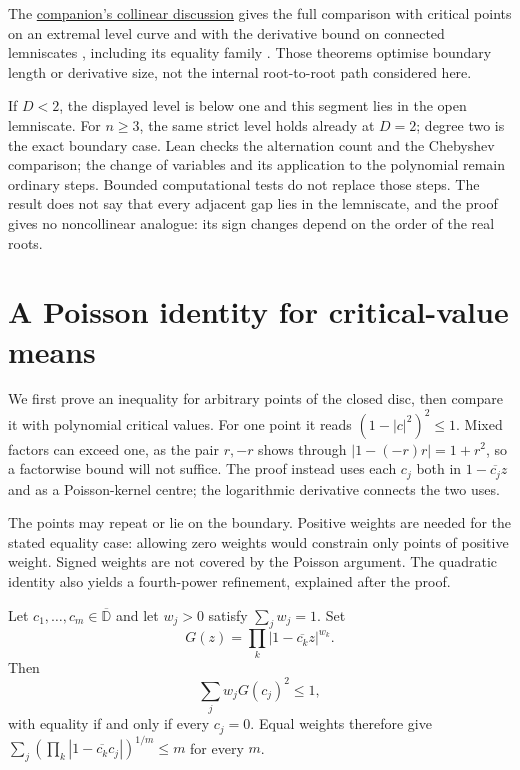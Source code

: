 \documentclass[11pt]{article}
\begin{document}
The \href{erdos1041-lemniscate-reasoning-surface.pdf\#collinear-source-comparison}{companion's collinear discussion} gives the full comparison with critical
points on an extremal level curve \cite[Lemma~5]{eremenko-hayman} and
with the derivative bound on connected lemniscates
\cite[Theorem~1]{eremenko-lempert}, including its equality family
\cite[Theorem~A]{eremenko-markov}. Those theorems optimise boundary length
or derivative size, not the internal root-to-root path considered here.

If $D<2$, the displayed level is below one and this segment lies in the open
lemniscate.  For $n\ge3$, the same strict level holds already at $D=2$;
degree two is the exact boundary case. Lean checks the alternation count
and the Chebyshev comparison; the change of variables and its application
to the polynomial remain ordinary steps. Bounded computational tests do
not replace those steps. The result does not say that every adjacent gap
lies in the lemniscate, and the proof gives no noncollinear analogue:
its sign changes depend on the order of the real roots.

\section{A Poisson identity for critical-value means}
\label{sec:freepoint}

We first prove an inequality for arbitrary points of the closed disc,
then compare it with polynomial critical values. For one point it reads
$(1-|c|^2)^2\le1$. Mixed factors can exceed one, as the pair $r,-r$
shows through $|1-(-r)r|=1+r^2$, so a factorwise bound will not suffice.
The proof instead uses each $c_j$ both in $1-\overline{c_j}z$ and as a
Poisson-kernel centre; the logarithmic derivative connects the two uses.

The points may repeat or lie on the boundary. Positive weights are
needed for the stated equality case: allowing zero weights would constrain
only points of positive weight. Signed weights are not covered by the
Poisson argument. The quadratic identity also yields a fourth-power
refinement, explained after the proof.

\begin{theorem}
\label{res:fp-weighted-all-degree}
Let $c_1,\ldots,c_m\in\overline{\mathbb D}$ and let $w_j>0$ satisfy
$\sum_j w_j=1$.  Set
\[
 G(z)=\prod_k |1-\overline{c_k}z|^{w_k}.
\]
Then
\[
 \sum_j w_j G(c_j)^2\le 1,
\]
with equality if and only if every $c_j=0$.  Equal weights therefore give
$\sum_j(\prod_k|1-\overline{c_k}c_j|)^{1/m}\le m$ for every $m$.
\end{theorem}
\end{document}
